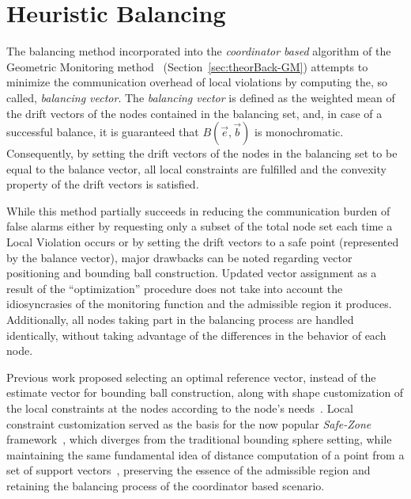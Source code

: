 \section{Heuristic Balancing} \label{sec:impl-heuristic}

The balancing method incorporated into the \emph{coordinator based} algorithm of the Geometric Monitoring method~\cite{Sharfman2006GM} (Section~\ref{sec:theorBack-GM}) attempts to minimize the communication overhead of local violations by computing the, so called, \emph{balancing vector}. The \emph{balancing vector} is defined as the weighted mean of the drift vectors of the nodes contained in the balancing set, and, in case of a successful balance, it is guaranteed that $B(\vec{e}, \vec{b})$ is monochromatic. Consequently, by setting the drift vectors of the nodes in the balancing set to be equal to the balance vector, all local constraints are fulfilled and the convexity property of the drift vectors is satisfied.

While this method partially succeeds in reducing the communication burden of false alarms either by requesting only a subset of the total node set each time a Local Violation occurs or by setting the drift vectors to a safe point (represented by the balance vector), major drawbacks can be noted regarding vector positioning and bounding ball construction. Updated vector assignment as a result of the ``optimization'' procedure does not take into account the idiosyncrasies of the monitoring function and the admissible region it produces. Additionally, all nodes taking part in the balancing process are handled identically, without taking advantage of the differences in the behavior of each node.

Previous work proposed selecting an optimal reference vector, instead of the estimate vector for bounding ball construction, along with shape customization of the local constraints at the nodes according to the node's needs~\cite{Sharfman2012ShapeSensGM}. Local constraint customization served as the basis for the now popular \emph{Safe-Zone} framework~\cite{Keren2013SafeZones, Keren2014GMHetStreams}, which diverges from the traditional bounding sphere setting, while maintaining the same fundamental idea of distance computation of a point from a set of support vectors~\cite{Samoladas2013Unification}, preserving the essence of the admissible region and retaining the balancing process of the coordinator based scenario.

